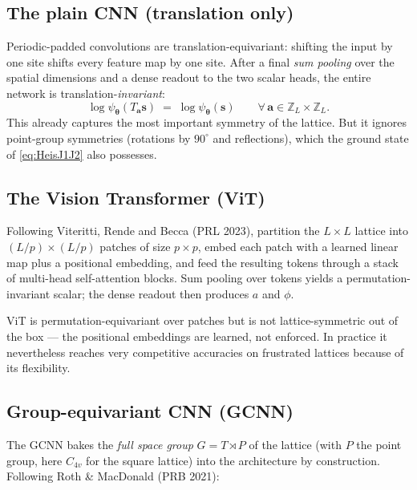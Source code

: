 \documentclass[11pt,a4paper]{article}
\newcommand{\Z}{\mathbb{Z}}
\newcommand{\bs}{\bm{s}}
\newcommand{\btheta}{\bm{\theta}}
\newcommand{\psip}{\psi_{\btheta}}
\theoremstyle{definition}
\theoremstyle{plain}
\begin{document}
\subsection{The plain CNN (translation only)}
Periodic-padded convolutions are translation-equivariant: shifting the
input by one site shifts every feature map by one site. After a final
\emph{sum pooling} over the spatial dimensions and a dense readout to the
two scalar heads, the entire network is translation-\emph{invariant}:
\begin{equation}
   \log\psip(T_{\bm a}\bs) \;=\; \log\psip(\bs)
   \qquad \forall\,\bm a \in \Z_{L}\times \Z_{L}.
\end{equation}
This already captures the most important symmetry of the lattice. But it
ignores point-group symmetries (rotations by $90^\circ$ and reflections),
which the ground state of \eqref{eq:HeisJ1J2} also possesses.

\subsection{The Vision Transformer (ViT)}
Following Viteritti, Rende and Becca (PRL 2023), partition the $L\times L$
lattice into $(L/p)\times(L/p)$ patches of size $p\times p$, embed each
patch with a learned linear map plus a positional embedding, and feed the
resulting tokens through a stack of multi-head self-attention blocks. Sum
pooling over tokens yields a permutation-invariant scalar; the dense
readout then produces $a$ and $\phi$.

ViT is permutation-equivariant over patches but is not lattice-symmetric
out of the box --- the positional embeddings are learned, not enforced.
In practice it nevertheless reaches very competitive accuracies on
frustrated lattices because of its flexibility.

\subsection{Group-equivariant CNN (GCNN)}
\label{sec:gcnn}

The GCNN bakes the \emph{full space group}
\(G = T \rtimes P\) of the lattice (with $P$ the point group, here
$C_{4v}$ for the square lattice) into the architecture by construction.
Following Roth \& MacDonald (PRB 2021):
\end{document}
